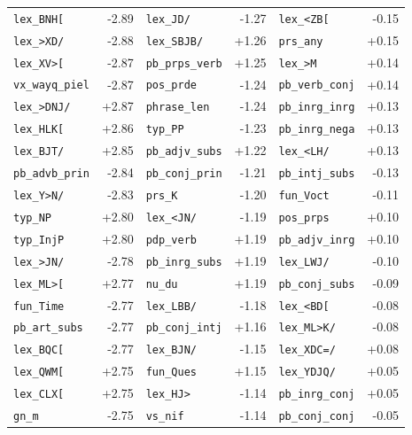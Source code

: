 \begin{longtable}{lrlrlr}
\texttt{lex\_BNH[} & -2.89 & \texttt{lex\_JD/} & -1.27 & \texttt{lex\_\textless{}ZB[} & -0.15 \\
\texttt{lex\_\textgreater{}XD/} & -2.88 & \texttt{lex\_SBJB/} & +1.26 & \texttt{prs\_any} & +0.15 \\
\texttt{lex\_XV\textgreater{}[} & -2.87 & \texttt{pb\_prps\_verb} & +1.25 & \texttt{lex\_\textgreater{}M} & +0.14 \\
\texttt{vx\_wayq\_piel} & -2.87 & \texttt{pos\_prde} & -1.24 & \texttt{pb\_verb\_conj} & +0.14 \\
\texttt{lex\_\textgreater{}DNJ/} & +2.87 & \texttt{phrase\_len} & -1.24 & \texttt{pb\_inrg\_inrg} & +0.13 \\
\texttt{lex\_HLK[} & +2.86 & \texttt{typ\_PP} & -1.23 & \texttt{pb\_inrg\_nega} & +0.13 \\
\texttt{lex\_BJT/} & +2.85 & \texttt{pb\_adjv\_subs} & +1.22 & \texttt{lex\_\textless{}LH/} & +0.13 \\
\texttt{pb\_advb\_prin} & -2.84 & \texttt{pb\_conj\_prin} & -1.21 & \texttt{pb\_intj\_subs} & -0.13 \\
\texttt{lex\_Y\textgreater{}N/} & -2.83 & \texttt{prs\_K} & -1.20 & \texttt{fun\_Voct} & -0.11 \\
\texttt{typ\_NP} & +2.80 & \texttt{lex\_\textless{}JN/} & -1.19 & \texttt{pos\_prps} & +0.10 \\
\texttt{typ\_InjP} & +2.80 & \texttt{pdp\_verb} & +1.19 & \texttt{pb\_adjv\_inrg} & +0.10 \\
\texttt{lex\_\textgreater{}JN/} & -2.78 & \texttt{pb\_inrg\_subs} & +1.19 & \texttt{lex\_LWJ/} & -0.10 \\
\texttt{lex\_ML\textgreater{}[} & +2.77 & \texttt{nu\_du} & +1.19 & \texttt{pb\_conj\_subs} & -0.09 \\
\texttt{fun\_Time} & -2.77 & \texttt{lex\_LBB/} & -1.18 & \texttt{lex\_\textless{}BD[} & -0.08 \\
\texttt{pb\_art\_subs} & -2.77 & \texttt{pb\_conj\_intj} & +1.16 & \texttt{lex\_ML\textgreater{}K/} & -0.08 \\
\texttt{lex\_BQC[} & -2.77 & \texttt{lex\_BJN/} & -1.15 & \texttt{lex\_XDC=/} & +0.08 \\
\texttt{lex\_QWM[} & +2.75 & \texttt{fun\_Ques} & +1.15 & \texttt{lex\_YDJQ/} & +0.05 \\
\texttt{lex\_CLX[} & +2.75 & \texttt{lex\_HJ\textgreater{}} & -1.14 & \texttt{pb\_inrg\_conj} & +0.05 \\
\texttt{gn\_m} & -2.75 & \texttt{vs\_nif} & -1.14 & \texttt{pb\_conj\_conj} & -0.05 \\

\end{longtable}
